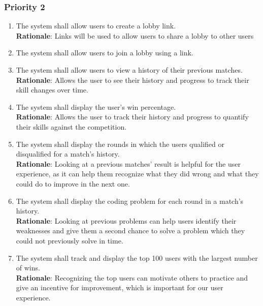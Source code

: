 \documentclass[12pt, titlepage]{article}
\begin{document}
\subsubsection{Priority 2}
\begin{enumerate}[label=FR.\arabic*, resume]
    \item The system shall allow users to create a lobby link. \label{FR.23}\\
     \textbf{Rationale}: Links will be used to allow users to share a lobby to other users
    \item The system shall allow users to join a lobby using a link. \label{FR.24}\\
    \item The system shall allow users to view a history of their previous matches. \label{FR.25}
     \textbf{Rationale}: Allows the user to see their history and progress to track their skill changes over time.
    \item The system shall display the user's win percentage. \label{FR.26}\\
     \textbf{Rationale}: Allows the user to track their history and progress to quantify their skills against the competition.
    \item The system shall display the rounds in which the users qualified or disqualified for a match's history.\\
    \textbf{Rationale}: Looking at a previous matches' result is helpful for the user experience, as it can help them recognize what they did wrong and what they could do to improve in the next one.
    \label{FR.27}
    \item The system shall display the coding problem for each round in a match's history.\\
    \textbf{Rationale}: Looking at previous problems can help users identify their weaknesses and give them a second chance to solve a problem which they could not previously solve in time. \label{FR.28}
    \item The system shall track and display the top 100 users with the largest number of wins. \label{FR.29}\\
    \textbf{Rationale}: Recognizing the top users can motivate others to practice and give an incentive for improvement, which is important for our user experience. 

\end{enumerate}
\end{document}
